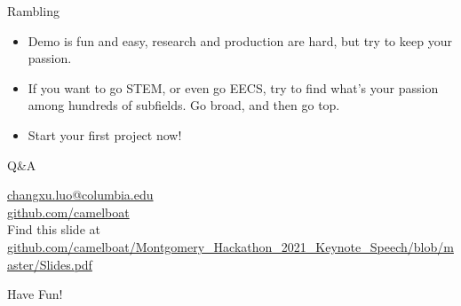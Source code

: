 \documentclass[aspectratio=169, 12pt]{beamer}
\begin{document}
\begin{frame}{Rambling}
\centering
{}
\vfill
\centering
\begin{itemize}
\scriptsize
\item Demo is fun and easy, research and production are hard, but try to keep your passion.
\item If you want to go STEM, or even go EECS, try to find what's your passion among hundreds of subfields. Go broad, and then go top.
\item Start your first project now!
\end{itemize}
\end{frame}

\begin{frame}{Q\&A}
\centering
{}
\vfill
\centering
\href{mailto:changxu.luo@columbia.edu}{changxu.luo@columbia.edu}
\\\medskip
\href{https://github.com/camelboat}{github.com/camelboat}
\\\medskip
\tiny Find this slide at \href{https://github.com/camelboat/Montgomery_Hackathon_2021_Keynote_Speech/blob/master/Slides.pdf}{github.com/camelboat/Montgomery\_Hackathon\_2021\_Keynote\_Speech/blob/master/Slides.pdf}
\end{frame}

\begin{frame}
\centering
\Huge
Have Fun!
\end{frame}

\end{document}
